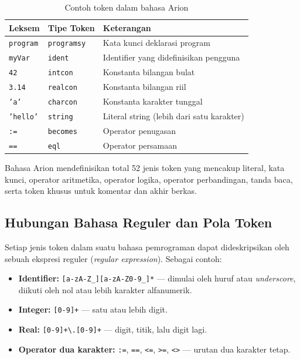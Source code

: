 \documentclass[12pt,a4paper]{article}
\begin{document}
\begin{table}[H]
  \centering
  \begin{tabular}{llp{6cm}}
    \toprule
    \textbf{Leksem} & \textbf{Tipe Token} & \textbf{Keterangan} \\
    \midrule
    \texttt{program}  & \texttt{programsy} & Kata kunci deklarasi program \\
    \texttt{myVar}    & \texttt{ident}     & Identifier yang didefinisikan pengguna \\
    \texttt{42}       & \texttt{intcon}    & Konstanta bilangan bulat \\
    \texttt{3.14}     & \texttt{realcon}   & Konstanta bilangan riil \\
    \texttt{'a'}      & \texttt{charcon}   & Konstanta karakter tunggal \\
    \texttt{'hello'}  & \texttt{string}    & Literal string (lebih dari satu karakter) \\
    \texttt{:=}       & \texttt{becomes}   & Operator penugasan \\
    \texttt{==}       & \texttt{eql}       & Operator persamaan \\
    \bottomrule
  \end{tabular}
  \caption{Contoh token dalam bahasa Arion}
\end{table}

Bahasa Arion mendefinisikan total 52 jenis token yang mencakup literal, kata kunci, operator aritmetika, operator logika, operator perbandingan, tanda baca, serta token khusus untuk komentar dan akhir berkas.

\subsection{Hubungan Bahasa Reguler dan Pola Token}
Setiap jenis token dalam suatu bahasa pemrograman dapat dideskripsikan oleh sebuah ekspresi reguler (\textit{regular expression}). Sebagai contoh:
\begin{itemize}[leftmargin=1.5em]
  \item \textbf{Identifier:} \verb|[a-zA-Z_][a-zA-Z0-9_]*| --- dimulai oleh huruf atau \textit{underscore}, diikuti oleh nol atau lebih karakter alfanumerik.
  \item \textbf{Integer:} \verb|[0-9]+| --- satu atau lebih digit.
  \item \textbf{Real:} \verb|[0-9]+\.[0-9]+| --- digit, titik, lalu digit lagi.
  \item \textbf{Operator dua karakter:} \verb|:=|, \verb|==|, \verb|<=|, \verb|>=|, \verb|<>| --- urutan dua karakter tetap.
\end{itemize}
\end{document}
